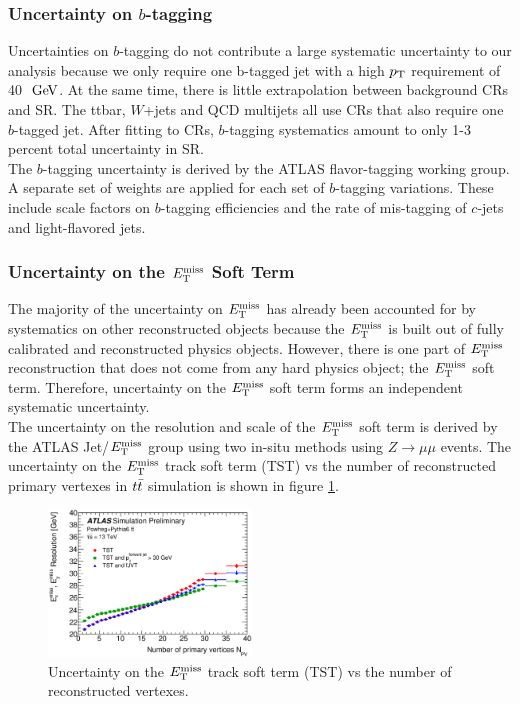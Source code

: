 \subsubsection*{Uncertainty on $b$-tagging}

\indent Uncertainties on $b$-tagging do not contribute a large systematic uncertainty to our analysis because we only require one b-tagged jet with a high $p_{\mathrm{T}}$ requirement of 40 $\gev$.  At the same time, there is little extrapolation between background CRs and SR. The ttbar, $W$+jets and QCD multijets all use CRs that also require one $b$-tagged jet.  After fitting to CRs, $b$-tagging systematics amount to only 1-3 percent total uncertainty in SR.  \\

\indent  The $b$-tagging uncertainty is derived by the ATLAS flavor-tagging working group.  A separate set of weights are applied for each set of $b$-tagging variations.  These include scale factors on $b$-tagging efficiencies and the rate of mis-tagging of $c$-jets and light-flavored jets. \\

\subsubsection*{Uncertainty on the $E_{\mathrm{T}}^{\mathrm{miss}}$ Soft Term}

\indent  The majority of the uncertainty on $E_{\mathrm{T}}^{\mathrm{miss}}$ has already been accounted for by systematics on other reconstructed objects because the $E_{\mathrm{T}}^{\mathrm{miss}}$ is built out of fully calibrated and reconstructed physics objects.  However, there is one part of $E_{\mathrm{T}}^{\mathrm{miss}}$ reconstruction that does not come from any hard physics object; the $E_{\mathrm{T}}^{\mathrm{miss}}$ soft term.  Therefore, uncertainty on the $E_{\mathrm{T}}^{\mathrm{miss}}$ soft term forms an independent systematic uncertainty.  \\

\indent The uncertainty on the resolution and scale of the $E_{\mathrm{T}}^{\mathrm{miss}}$ soft term is derived by the ATLAS Jet/$E_{\mathrm{T}}^{\mathrm{miss}}$ group using two in-situ methods using $Z\rightarrow \mu\mu$ events.\cite{METPerform} The uncertainty on the $E_{\mathrm{T}}^{\mathrm{miss}}$ track soft term (TST) vs the number of reconstructed primary vertexes in $t\bar{t}$ simulation is shown in figure \ref{fig:sys:MET_TST_tt}. \\

\begin{figure}[!htbp]
\begin{center}
\includegraphics[width=0.48\textwidth]{figures/METCalib/MET_TST_tt.eps}
\caption{Uncertainty on the $E_{\mathrm{T}}^{\mathrm{miss}}$ track soft term (TST) vs the number of reconstructed vertexes.  }
\label{fig:sys:MET_TST_tt}
\end{center}
\end{figure}

